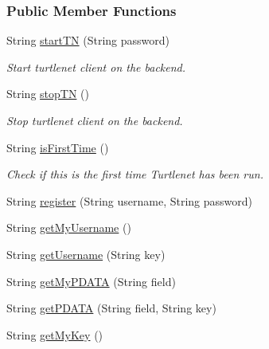 \subsubsection*{Public Member Functions}
\begin{DoxyCompactItemize}
\item 
String \hyperlink{classballmerpeak_1_1turtlenet_1_1server_1_1TurtlenetImpl_ae95fc767bafaeab9ba8fd2ce0ace0dde}{start\-T\-N} (String password)
\begin{DoxyCompactList}\small\item\em Start turtlenet client on the backend. \end{DoxyCompactList}\item 
String \hyperlink{classballmerpeak_1_1turtlenet_1_1server_1_1TurtlenetImpl_a5a81c607293705d6bc5a9b5c087ef411}{stop\-T\-N} ()
\begin{DoxyCompactList}\small\item\em Stop turtlenet client on the backend. \end{DoxyCompactList}\item 
String \hyperlink{classballmerpeak_1_1turtlenet_1_1server_1_1TurtlenetImpl_a64ed53b1b7c02e2a7869dba9a9adeb6b}{is\-First\-Time} ()
\begin{DoxyCompactList}\small\item\em Check if this is the first time Turtlenet has been run. \end{DoxyCompactList}\item 
String \hyperlink{classballmerpeak_1_1turtlenet_1_1server_1_1TurtlenetImpl_ad77aeae77cad163b1fcd099404747f91}{register} (String username, String password)
\item 
String \hyperlink{classballmerpeak_1_1turtlenet_1_1server_1_1TurtlenetImpl_a4ad92d61008b207cf46dcfdc31e5ea22}{get\-My\-Username} ()
\item 
String \hyperlink{classballmerpeak_1_1turtlenet_1_1server_1_1TurtlenetImpl_a89342b1ea50df43e072c154fdd389d1c}{get\-Username} (String key)
\item 
String \hyperlink{classballmerpeak_1_1turtlenet_1_1server_1_1TurtlenetImpl_acc52a5b5a58896bf97348ccd506acb5c}{get\-My\-P\-D\-A\-T\-A} (String field)
\item 
String \hyperlink{classballmerpeak_1_1turtlenet_1_1server_1_1TurtlenetImpl_a2488f315ab0410704181e88c19e74b8c}{get\-P\-D\-A\-T\-A} (String field, String key)
\item 
String \hyperlink{classballmerpeak_1_1turtlenet_1_1server_1_1TurtlenetImpl_a9c718d4f71c51932d61f308049f1f99d}{get\-My\-Key} ()

\end{DoxyCompactItemize}
